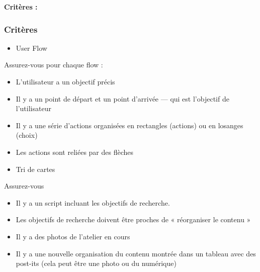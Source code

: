 \textbf{Critères :}

\subsubsection*{Critères}

\begin{itemize}
\item User Flow
\end{itemize}

Assurez-vous pour chaque flow :

\begin{itemize}
\item L'utilisateur a un objectif précis
\item Il y a un point de départ et un point d'arrivée  ---  qui est l'objectif de l'utilisateur
\item Il y a une série d'actions organisées en rectangles (actions) ou en losanges (choix)
\item Les actions sont reliées par des flèches
\end{itemize}

\begin{itemize}
\item Tri de cartes
\end{itemize}

Assurez-vous

\begin{itemize}
\item Il y a un script incluant les objectifs de recherche.
\item Les objectifs de recherche doivent être proches de « réorganiser le contenu »
\item Il y a des photos de l'atelier en cours
\item Il y a une nouvelle organisation du contenu montrée dans un tableau avec des post-its (cela peut être une photo ou du numérique)
\end{itemize}

